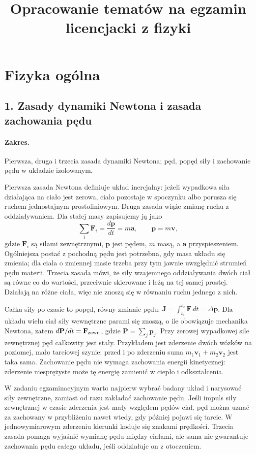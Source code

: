 \documentclass[11pt,a4paper]{article}
\title{Opracowanie tematów na egzamin licencjacki z fizyki}
\author{}
\date{}
\begin{document}
\maketitle
\tableofcontents
\clearpage

\section{Fizyka ogólna}
\subsection{1. Zasady dynamiki Newtona i zasada zachowania pędu}
\paragraph{Zakres.} Pierwsza, druga i trzecia zasada dynamiki Newtona; pęd, popęd siły i zachowanie pędu w układzie izolowanym.

Pierwsza zasada Newtona definiuje układ inercjalny: jeżeli wypadkowa siła działająca na ciało jest zerowa, ciało pozostaje w spoczynku albo porusza się ruchem jednostajnym prostoliniowym. Druga zasada wiąże zmianę ruchu z oddziaływaniem. Dla stałej masy zapisujemy ją jako
\[
\sum_i \mathbf F_i=\frac{d\mathbf p}{dt}=m\mathbf a,\qquad \mathbf p=m\mathbf v,
\]
gdzie $\mathbf F_i$ są siłami zewnętrznymi, $\mathbf p$ jest pędem, $m$ masą, a $\mathbf a$ przyspieszeniem. Ogólniejsza postać z pochodną pędu jest potrzebna, gdy masa układu się zmienia; dla ciała o zmiennej masie trzeba przy tym jawnie uwzględnić strumień pędu materii. Trzecia zasada mówi, że siły wzajemnego oddziaływania dwóch ciał są równe co do wartości, przeciwnie skierowane i leżą na tej samej prostej. Działają na różne ciała, więc nie znoszą się w równaniu ruchu jednego z nich.

Całka siły po czasie to popęd, równy zmianie pędu: $\mathbf J=\int_{t_1}^{t_2}\mathbf F\,dt=\Delta\mathbf p$. Dla układu wielu ciał siły wewnętrzne parami się znoszą, o ile obowiązuje mechanika Newtona, zatem $d\mathbf P/dt=\mathbf F_{\rm zewn}$, gdzie $\mathbf P=\sum_j\mathbf p_j$. Przy zerowej wypadkowej sile zewnętrznej pęd całkowity jest stały. Przykładem jest zderzenie dwóch wózków na poziomej, mało tarciowej szynie: przed i po zderzeniu suma $m_1\mathbf v_1+m_2\mathbf v_2$ jest taka sama. Zachowanie pędu nie wymaga zachowania energii kinetycznej: zderzenie niesprężyste może tę energię zamienić w ciepło i odkształcenia.

W zadaniu egzaminacyjnym warto najpierw wybrać badany układ i narysować siły zewnętrzne, zamiast od razu zakładać zachowanie pędu. Jeśli impuls siły zewnętrznej w czasie zderzenia jest mały względem pędów ciał, pęd można uznać za zachowany w przybliżeniu nawet wtedy, gdy później pojawi się tarcie. W jednowymiarowym zderzeniu kierunki koduje się znakami prędkości. Trzecia zasada pomaga wyjaśnić wymianę pędu między ciałami, ale sama nie gwarantuje zachowania pędu całego układu, jeśli oddziałuje on z otoczeniem.
\end{document}
